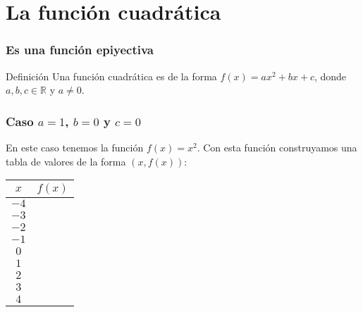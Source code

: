 \documentclass[12pt,spanish,x11names]{beamer}
\def\RR{\mathbb{R}}
\begin{document}
\section{La función cuadrática}
\begin{frame}
  \frametitle{Es una función epiyectiva}
  \begin{block}{Definición}
    Una función cuadrática es de la forma $f(x)=ax^2+bx+c$, donde $a,b,c\in\RR$
    y $a\neq0$.
  \end{block}
\end{frame}
\begin{frame}
  \frametitle{Caso $a=1$, $b=0$ y $c=0$}
  \pause
  En este caso tenemos la función $f(x)=x^2$. Con esta función construyamos una
  tabla de valores de la forma $(x,f(x))$:

  \centering
  \begin{tabular}[t]{|c|c|}
    \hline
    $x$ & $f(x)$\\
    \hline
    $-4$ & \\      
    \hline
    $-3$ & \\      
    \hline
    $-2$ & \\      
    \hline
    $-1$ & \\      
    \hline
    $0$ & \\      
    \hline
    $1$ & \\      
    \hline
    $2$ & \\      
    \hline
    $3$ & \\      
    \hline
    $4$ & \\
    \hline
  \end{tabular}
\end{frame}
\end{document}
